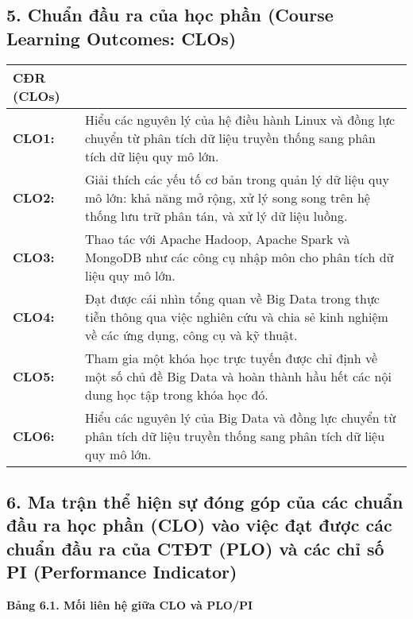 \documentclass[a4paper,13pt]{article}
\begin{document}
\subsection*{5. Chuẩn đầu ra của học phần (Course Learning Outcomes: CLOs)}
\begin{longtable}{|>{\centering\arraybackslash}m{2cm}|>{\raggedright\arraybackslash}m{13cm}|}
\hline
\textbf{CĐR (CLOs)} & \multicolumn{1}{|>{\centering\arraybackslash}m{13cm}|}{\textbf{Nội dung CĐR học phần (CLOs)}} \\
\hline
\textbf{CLO1:} & Hiểu các nguyên lý của hệ điều hành Linux và đồng lực chuyển từ phân tích dữ liệu truyền thống sang phân tích dữ liệu quy mô lớn. \\
\hline
\textbf{CLO2:} & Giải thích các yếu tố cơ bản trong quản lý dữ liệu quy mô lớn: khả năng mở rộng, xử lý song song trên hệ thống lưu trữ phân tán, và xử lý dữ liệu luồng. \\
\hline
\textbf{CLO3:} & Thao tác với Apache Hadoop, Apache Spark và MongoDB như các công cụ nhập môn cho phân tích dữ liệu quy mô lớn. \\
\hline
\textbf{CLO4:} & Đạt được cái nhìn tổng quan về Big Data trong thực tiễn thông qua việc nghiên cứu và chia sẻ kinh nghiệm về các ứng dụng, công cụ và kỹ thuật. \\
\hline
\textbf{CLO5:} & Tham gia một khóa học trực tuyến được chỉ định về một số chủ đề Big Data và hoàn thành hầu hết các nội dung học tập trong khóa học đó. \\
\hline
\textbf{CLO6:} & Hiểu các nguyên lý của Big Data và đồng lực chuyển từ phân tích dữ liệu truyền thống sang phân tích dữ liệu quy mô lớn. \\
\hline
\end{longtable}

\subsection*{6. Ma trận thể hiện sự đóng góp của các chuẩn đầu ra học phần (CLO) vào việc đạt được các chuẩn đầu ra của CTĐT (PLO) và các chỉ số PI (Performance Indicator)}

\centerline{\textbf{Bảng 6.1. Mối liên hệ giữa CLO và PLO/PI}}
\end{document}

